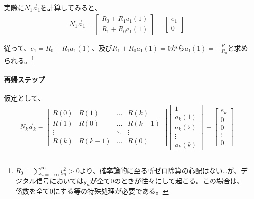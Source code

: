 \documentclass[uplatex,dvipdfmx,b5j,10pt]{jsbook}
\theoremstyle{definition}
\begin{document}
実際に$N_{1}\vec{a}_{1}$を計算してみると、
\begin{eqnarray*}
  N_{1}\vec{a}_{1}=
  \begin{bmatrix}
    R_{0} + R_{1}a_{1}(1) \\ 
    R_{1} + R_{0}a_{1}(1)
  \end{bmatrix}=
  \begin{bmatrix}
    e_{1} \\ 
    0
  \end{bmatrix}
\end{eqnarray*}

従って、$e_{1} = R_{0} + R_{1}a_{1}(1)$、及び$R_{1} + R_{0}a_{1}(1) = 0$から$a_{1}(1) = -\displaystyle\frac{R_{1}}{R_{0}}$と求められる。\footnote{\(R_{0} = \displaystyle\sum_{n=-\infty}^{\infty}y_{n}^{2} > 0\)より、確率論的に至る所ゼロ除算の心配はない…が、デジタル信号においては$y_{n}$が全て$0$のときが往々にして起こる。この場合は、係数を全て$0$にする等の特殊処理が必要である。}

\paragraph{再帰ステップ}

仮定として、
\begin{eqnarray*}
  N_{k}\vec{a}_{k}=
  \begin{bmatrix}
    R(0) & R(1) & \dots & R(k)   \\
    R(1) & R(0) & \dots & R(k-1) \\
    \vdots &       & \ddots   & \vdots  \\
    R(k) & R(k-1) & ... & R(0)
  \end{bmatrix}
  \begin{bmatrix}
    1 \\ a_{k}(1) \\ a_{k}(2) \\ \vdots \\ a_{k}(k) 
  \end{bmatrix}
  =\begin{bmatrix}
    e_{k} \\ 0 \\ 0 \\ \vdots \\ 0 
  \end{bmatrix}
\end{eqnarray*}
\end{document}
